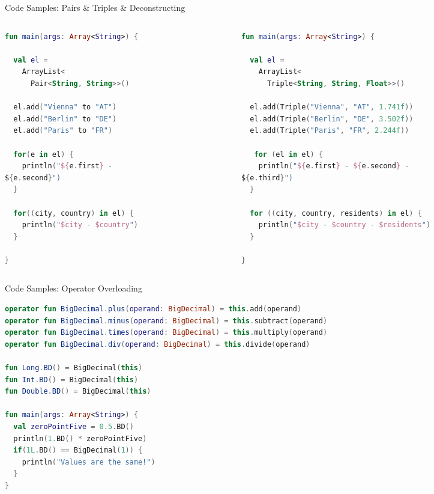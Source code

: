 \begin{frame}[fragile]{Code Samples: Pairs \& Triples \& Deconstructing}
	\begin{columns}
		\begin{column}{0.45\textwidth}
\begin{lstlisting}[language=Kotlin,basicstyle=\ttfamily\scriptsize]
fun main(args: Array<String>) {

  val el =
    ArrayList<
      Pair<String, String>>()

  el.add("Vienna" to "AT")
  el.add("Berlin" to "DE")
  el.add("Paris" to "FR")

  for(e in el) {
    println("${e.first} -
${e.second}")
  }

  for((city, country) in el) {
    println("$city - $country")
  }

}
\end{lstlisting}
		\end{column}
		\begin{column}{0.55\textwidth}
\begin{lstlisting}[language=Kotlin,basicstyle=\ttfamily\scriptsize]
fun main(args: Array<String>) {

  val el =
    ArrayList<
      Triple<String, String, Float>>()

  el.add(Triple("Vienna", "AT", 1.741f))
  el.add(Triple("Berlin", "DE", 3.502f))
  el.add(Triple("Paris", "FR", 2.244f))

   for (el in el) {
    println("${e.first} - ${e.second} -
${e.third}")
  }

  for ((city, country, residents) in el) {
    println("$city - $country - $residents")
  }

}
\end{lstlisting}
		\end{column}
	\end{columns}
\end{frame}

\begin{frame}[fragile]{Code Samples: Operator Overloading}
\begin{lstlisting}[language=Kotlin,basicstyle=\ttfamily\scriptsize]
operator fun BigDecimal.plus(operand: BigDecimal) = this.add(operand)
operator fun BigDecimal.minus(operand: BigDecimal) = this.subtract(operand)
operator fun BigDecimal.times(operand: BigDecimal) = this.multiply(operand)
operator fun BigDecimal.div(operand: BigDecimal) = this.divide(operand)

fun Long.BD() = BigDecimal(this)
fun Int.BD() = BigDecimal(this)
fun Double.BD() = BigDecimal(this)

fun main(args: Array<String>) {
  val zeroPointFive = 0.5.BD()
  println(1.BD() * zeroPointFive)
  if(1L.BD() == BigDecimal(1)) {
    println("Values are the same!")
  }
}
\end{lstlisting}
\end{frame}

